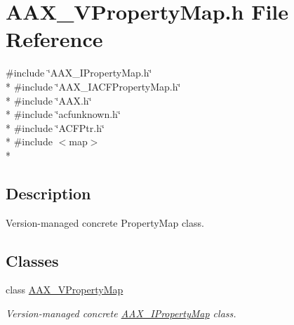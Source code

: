 \hypertarget{a00314}{}\section{A\+A\+X\+\_\+\+V\+Property\+Map.\+h File Reference}
\label{a00314}
{\ttfamily \#include \char`\"{}A\+A\+X\+\_\+\+I\+Property\+Map.\+h\char`\"{}}\\*
{\ttfamily \#include \char`\"{}A\+A\+X\+\_\+\+I\+A\+C\+F\+Property\+Map.\+h\char`\"{}}\\*
{\ttfamily \#include \char`\"{}A\+A\+X.\+h\char`\"{}}\\*
{\ttfamily \#include \char`\"{}acfunknown.\+h\char`\"{}}\\*
{\ttfamily \#include \char`\"{}A\+C\+F\+Ptr.\+h\char`\"{}}\\*
{\ttfamily \#include $<$map$>$}\\*


\subsection{Description}
Version-\/managed concrete Property\+Map class. 

\subsection*{Classes}
\begin{DoxyCompactItemize}
\item 
class \hyperlink{a00140}{A\+A\+X\+\_\+\+V\+Property\+Map}
\begin{DoxyCompactList}\small\item\em Version-\/managed concrete \hyperlink{a00112}{A\+A\+X\+\_\+\+I\+Property\+Map} class. \end{DoxyCompactList}\end{DoxyCompactItemize}
